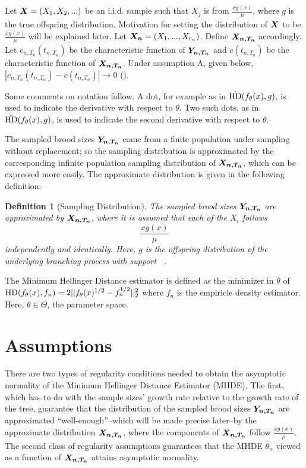 \documentclass[11 pt]{article}
\newtheorem{defn}{Definition} %
\def\boldX{\mbox{\boldmath $X$}}
\renewcommand{\th}{\theta}
\newcommand{\fbr}[1]{ \mathop{ \left\{ #1 \right\} } }
\newcommand{\boldXn}{\mbox{\boldmath $X_n$}}
\newcommand{\boldXnt}{\mbox{\boldmath $X_{n,T_n}$}}
\newcommand{\boldYnt}{\mbox{\boldmath $Y_{n,T_n}$}}
\newcommand{\hell}{\text{HD}}
\newcommand{\dhell}{\dot{\hell}}
\newcommand{\ddhell}{\ddot{\hell}}
\newcommand{\gs}{\frac{xg(x)}{\mu}}
\newcommand{\mhde}{\hat{\th}_n}
\begin{document}
Let $\boldX = (X_1,X_2,...)$ be an i.i.d. sample such that $X_{j}$ is from $\gs$, where $g$ is the true offspring distribution. Motivation for setting the distribution of $\boldX$ to be $\gs$ will be explained later. Let $\boldXn = (X_1,...,X_{r_n})$. Define $\boldXnt$ accordingly. Let $c_{n,T_n}(t_{n,T_n})$ be the characteristic function of $\boldYnt$ and $c(t_{n,T_n})$ be the characteristic function of $\boldXnt$. Under assumption A, given below, $|c_{n,T_n}(t_{n,T_n}) - c(t_{n,T_n})| \rightarrow 0$ (\cite{mm}).

Some comments on notation follow. A dot, for example as in $\dhell (\fth,g )$, is used to indicate the derivative with respect to $\th$. Two such dots, as in $\ddhell(\fth,g)$, is used to indicate the second derivative with respect to $\th$.

The sampled brood sizes $\boldYnt$ come from a finite population under sampling without replacement; so the sampling distribution is approximated by the corresponding infinite population sampling distribution of $\boldXnt$, which can be expressed more easily. The approximate distribution is given in the following definition:

\begin{defn}[Sampling Distribution] The sampled brood sizes $\boldYnt$ are approximated by $\boldXnt$, where it is assumed that each of the $X_i$ follows
\[
\gs
\]
independently and identically. Here, $g$ is the offspring distribution of the underlying branching process with support $\fbr{1,2,...}$.
\end{defn}

The Minimum Hellinger Distance estimator is defined as the minimizer in $\th$ of $\hell (\fth,f_n) = 2 ||\fth^{1/2}-f_n^{1/2}||_2^2$ where $f_n$ is the empiricle density estimator. Here, $\th \in \Theta$, the parameter space. 


\section{Assumptions}
There are two types of regularity conditions needed to obtain the asymptotic normality of the Minimum Hellinger Distance Estimator (MHDE). The first, which has to do with the sample sizes' growth rate relative to the growth rate of the tree, guarantee that the distribution of the sampled brood sizes $\boldYnt$ are approximated ``well-enough''--which will be made precise later--by the approximate distribution $\boldXnt$, where the components of $\boldXnt$ follow $\gs$. The second class of regularity assumptions guarantees that the MHDE $\mhde$ viewed as a function of $\boldXnt$ attains asymptotic normality. 
\end{document}
